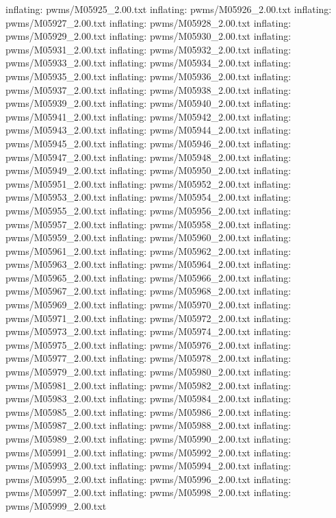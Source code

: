 \documentclass[letterpaper,10pt,english]{sphinxmanual}
\begin{document}
{\begin{sphinxVerbatim}[commandchars=\\\{\}]
  inflating: pwms/M05925\_2.00.txt
  inflating: pwms/M05926\_2.00.txt
  inflating: pwms/M05927\_2.00.txt
  inflating: pwms/M05928\_2.00.txt
  inflating: pwms/M05929\_2.00.txt
  inflating: pwms/M05930\_2.00.txt
  inflating: pwms/M05931\_2.00.txt
  inflating: pwms/M05932\_2.00.txt
  inflating: pwms/M05933\_2.00.txt
  inflating: pwms/M05934\_2.00.txt
  inflating: pwms/M05935\_2.00.txt
  inflating: pwms/M05936\_2.00.txt
  inflating: pwms/M05937\_2.00.txt
  inflating: pwms/M05938\_2.00.txt
  inflating: pwms/M05939\_2.00.txt
  inflating: pwms/M05940\_2.00.txt
  inflating: pwms/M05941\_2.00.txt
  inflating: pwms/M05942\_2.00.txt
  inflating: pwms/M05943\_2.00.txt
  inflating: pwms/M05944\_2.00.txt
  inflating: pwms/M05945\_2.00.txt
  inflating: pwms/M05946\_2.00.txt
  inflating: pwms/M05947\_2.00.txt
  inflating: pwms/M05948\_2.00.txt
  inflating: pwms/M05949\_2.00.txt
  inflating: pwms/M05950\_2.00.txt
  inflating: pwms/M05951\_2.00.txt
  inflating: pwms/M05952\_2.00.txt
  inflating: pwms/M05953\_2.00.txt
  inflating: pwms/M05954\_2.00.txt
  inflating: pwms/M05955\_2.00.txt
  inflating: pwms/M05956\_2.00.txt
  inflating: pwms/M05957\_2.00.txt
  inflating: pwms/M05958\_2.00.txt
  inflating: pwms/M05959\_2.00.txt
  inflating: pwms/M05960\_2.00.txt
  inflating: pwms/M05961\_2.00.txt
  inflating: pwms/M05962\_2.00.txt
  inflating: pwms/M05963\_2.00.txt
  inflating: pwms/M05964\_2.00.txt
  inflating: pwms/M05965\_2.00.txt
  inflating: pwms/M05966\_2.00.txt
  inflating: pwms/M05967\_2.00.txt
  inflating: pwms/M05968\_2.00.txt
  inflating: pwms/M05969\_2.00.txt
  inflating: pwms/M05970\_2.00.txt
  inflating: pwms/M05971\_2.00.txt
  inflating: pwms/M05972\_2.00.txt
  inflating: pwms/M05973\_2.00.txt
  inflating: pwms/M05974\_2.00.txt
  inflating: pwms/M05975\_2.00.txt
  inflating: pwms/M05976\_2.00.txt
  inflating: pwms/M05977\_2.00.txt
  inflating: pwms/M05978\_2.00.txt
  inflating: pwms/M05979\_2.00.txt
  inflating: pwms/M05980\_2.00.txt
  inflating: pwms/M05981\_2.00.txt
  inflating: pwms/M05982\_2.00.txt
  inflating: pwms/M05983\_2.00.txt
  inflating: pwms/M05984\_2.00.txt
  inflating: pwms/M05985\_2.00.txt
  inflating: pwms/M05986\_2.00.txt
  inflating: pwms/M05987\_2.00.txt
  inflating: pwms/M05988\_2.00.txt
  inflating: pwms/M05989\_2.00.txt
  inflating: pwms/M05990\_2.00.txt
  inflating: pwms/M05991\_2.00.txt
  inflating: pwms/M05992\_2.00.txt
  inflating: pwms/M05993\_2.00.txt
  inflating: pwms/M05994\_2.00.txt
  inflating: pwms/M05995\_2.00.txt
  inflating: pwms/M05996\_2.00.txt
  inflating: pwms/M05997\_2.00.txt
  inflating: pwms/M05998\_2.00.txt
  inflating: pwms/M05999\_2.00.txt

\end{sphinxVerbatim}}
\end{document}
